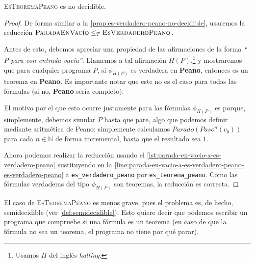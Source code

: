 \begin{proposicion}\label{prop:es-teorema-peano-no-decidible}
\textsc{EsTeoremaPeano} es no decidible.
\end{proposicion}
\begin{proof}
De forma similar a la \cref{prop:es-verdadero-peano-no-decidible}, usaremos la reducción \linebreak $\textsc{ParadaEnVacío} \leq_T \textsc{EsVerdaderoPeano}$.

Antes de esto, debemos apreciar una propiedad de las afirmaciones de la forma \emph{``$P$ para con entrada vacía''}. Llamemos a tal afirmación $H(P)$,\footnote{Usamos $H$ del inglés \emph{halting}.} y mostraremos que para cualquier programa $P$, si $\phi_{H(P)}$ es verdadera en \textbf{Peano}, entonces es un teorema en \textbf{Peano}. Es importante notar que este no es el caso para todas las fórmulas (si no, \textbf{Peano} sería completo).

El motivo por el que esto ocurre justamente para las fórmulas $\phi_{H(P)}$ es porque, simplemente, debemos simular $P$ hasta que pare, algo que podemos definir mediante aritmética de Peano: simplemente calculamos $Parado(Paso^n(c_0))$ para cada $n\in\mathbb{N}$ de forma incremental, hasta que el resultado sea $1$.

Ahora podemos realizar la reducción usando el \cref{lst:parada-en-vacio-a-es-verdadero-peano} sustituyendo en la \cref{line:parada-en-vacio-a-es-verdadero-peano-es-verdadero-peano} a \texttt{es\_verdadero\_peano} por \texttt{es\_teorema\_peano}. Como las fórmulas verdaderas del tipo $\phi_{H(P)}$ son teoremas, la reducción es correcta.
\end{proof}

El caso de \textsc{EsTeoremaPeano} es menos grave, pues el problema es, de hecho, semidecidible (ver \cref{def:semidecidible}). Esto quiere decir que podemos escribir un programa que compruebe si una fórmula es un teorema (en caso de que la fórmula no sea un teorema, el programa no tiene por qué parar). \cite{MacCormick2018}

